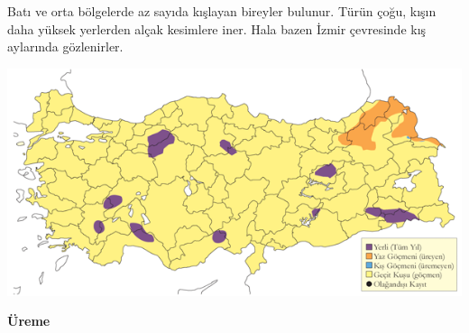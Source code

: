 \documentclass[
  a4paper,
  DIV=11,
  numbers=noendperiod]{scrreprt}
\begin{document}
Batı ve orta bölgelerde az sayıda kışlayan bireyler bulunur. Türün çoğu,
kışın daha yüksek yerlerden alçak kesimlere iner. Hala bazen İzmir
çevresinde kış aylarında gözlenirler.

\includegraphics{images/harita_Page_087.png}

\textbf{Üreme}
\end{document}
